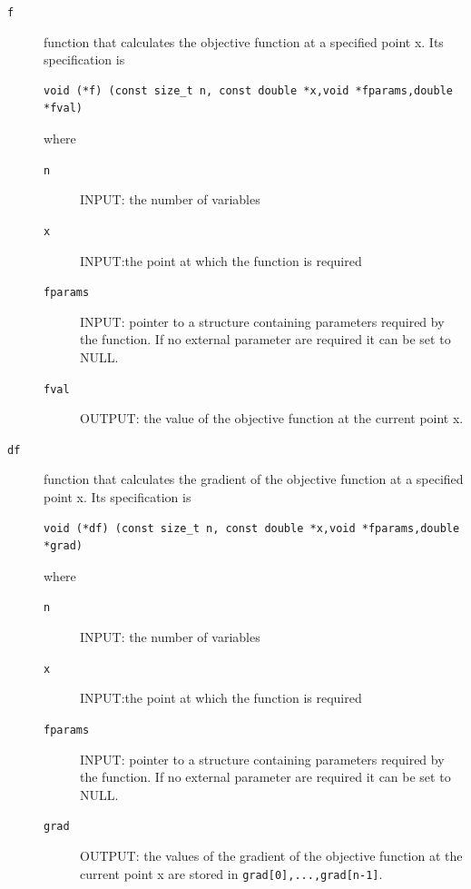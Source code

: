 \documentclass[11pt]{article}
\begin{document}
\begin{description}
\item[\texttt{f}] function that calculates the objective function at a specified
         point x. Its specification is
  
\begin{verbatim}
void (*f) (const size_t n, const double *x,void *fparams,double *fval)
\end{verbatim}
         where
\begin{description}
\item[\texttt{n}] INPUT: the number of variables
\item[\texttt{x}] INPUT:the point at which the function is required
\item[\texttt{fparams}] INPUT: pointer to a structure containing
                     parameters required by the function. If no
                     external parameter are required it can be set to
                     NULL.
\item[\texttt{fval}] OUTPUT: the value of the objective function at
                     the current point x.
\end{description}
\end{description}

\begin{description}
\item[\texttt{df}] function that calculates the gradient of the objective
          function at a specified point x. Its specification is

\begin{verbatim}
void (*df) (const size_t n, const double *x,void *fparams,double *grad)
\end{verbatim}
         where
\begin{description}
\item[\texttt{n}] INPUT: the number of variables
\item[\texttt{x}] INPUT:the point at which the function is required
\item[\texttt{fparams}] INPUT: pointer to a structure containing
                     parameters required by the function. If no
                     external parameter are required it can be set to
                     NULL.
\item[\texttt{grad}] OUTPUT: the values of the gradient of the
                     objective function at the current point x are
                     stored in \texttt{grad[0],...,grad[n-1]}.
\end{description}
\end{description}
\end{document}

